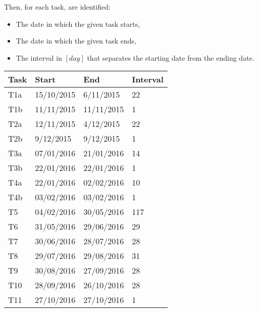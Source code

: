 \newpage
Then, for each task, are identified:
\begin{itemize}
	\item The date in which the given task starts,
	\item The date in which the given task ends,
	\item The interval in $[day]$ that separates the starting date from the ending date.
\end{itemize}
\begin{center}
	\begin{tabulary}{\linewidth\tymin=70pt}{Y{1cm}|Y{3cm}|Y{3cm}|Y{1.7cm}}
		\textbf{Task} & \textbf{Start} & \textbf{End} & \textbf{Interval} \\ \hline
		T1a & 15/10/2015 & 6/11/2015 & 22\\ \hline
		T1b & 11/11/2015 & 11/11/2015 & 1\\ \hline
		T2a & 12/11/2015 & 4/12/2015 & 22\\ \hline
		T2b & 9/12/2015 & 9/12/2015 & 1\\ \hline
		T3a & 07/01/2016 & 21/01/2016 & 14\\ \hline
		T3b & 22/01/2016 & 22/01/2016 & 1\\ \hline
		T4a & 22/01/2016 & 02/02/2016 & 10\\ \hline
		T4b & 03/02/2016 & 03/02/2016 & 1\\ \hline
		T5 & 04/02/2016 & 30/05/2016 & 117\\ \hline
		T6 & 31/05/2016 & 29/06/2016 & 29\\ \hline
		T7 & 30/06/2016 & 28/07/2016 & 28\\ \hline
		T8 & 29/07/2016 & 29/08/2016 & 31\\ \hline
		T9 & 30/08/2016 & 27/09/2016 & 28\\ \hline
		T10 & 28/09/2016 & 26/10/2016 & 28\\ \hline
		T11 & 27/10/2016 & 27/10/2016 & 1\\
	\end{tabulary}
\end{center}
%
\newpage
